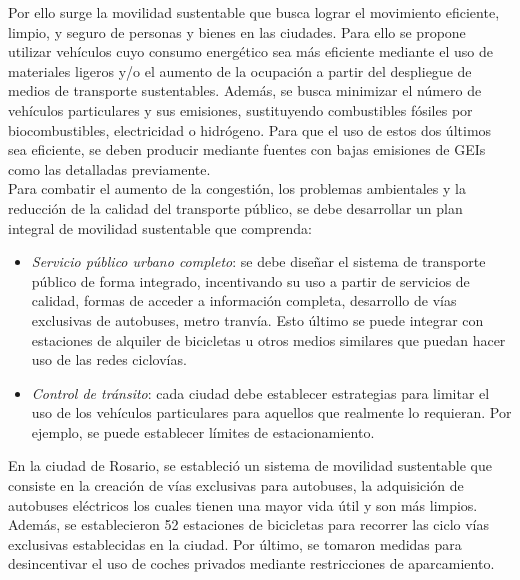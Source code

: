 \documentclass[runningheads]{llncs}
\begin{document}
Por ello surge la movilidad sustentable que busca lograr el movimiento eficiente, limpio, y seguro de personas y bienes en las ciudades. Para ello se propone utilizar vehículos cuyo consumo energético sea más eficiente mediante el uso de materiales ligeros y/o el aumento de la ocupación a partir del despliegue de medios de transporte sustentables. Además, se busca minimizar el número de vehículos particulares y sus emisiones, sustituyendo combustibles fósiles por biocombustibles, electricidad o hidrógeno. Para que el uso de estos dos últimos sea eficiente, se deben producir mediante fuentes con bajas emisiones de GEIs como las detalladas previamente.\\

Para combatir el aumento de la congestión, los problemas ambientales y la reducción de la calidad del transporte público, se debe desarrollar un plan integral de movilidad sustentable que comprenda:\\

\begin{itemize}
    \item \textit{Servicio público urbano completo}: se debe diseñar el sistema de transporte público de forma integrado, incentivando su uso a partir de servicios de calidad, formas de acceder a información completa, desarrollo de vías exclusivas de autobuses, metro tranvía. Esto último se puede integrar con estaciones de alquiler de bicicletas u otros medios similares que puedan hacer uso de las redes ciclovías.\\
    \item \textit{Control de tránsito}: cada ciudad debe establecer estrategias para limitar el uso de los vehículos particulares para aquellos que realmente lo requieran. Por ejemplo, se puede establecer límites de estacionamiento.\\
    
\end{itemize}

En la ciudad de Rosario, se estableció un sistema de movilidad sustentable que consiste en la creación de vías exclusivas para autobuses, la adquisición de autobuses eléctricos los cuales tienen una mayor vida útil y son más limpios. Además, se establecieron 52 estaciones de bicicletas para recorrer las ciclo vías exclusivas establecidas en la ciudad. Por último, se tomaron medidas para desincentivar el uso de coches privados mediante restricciones de aparcamiento.~\cite{ref_url3}\\
\end{document}
